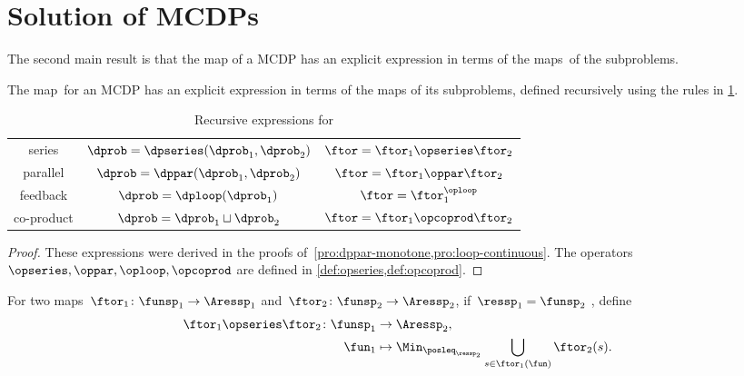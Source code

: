 

\section{Solution of MCDPs}
\label{sec:Solution-of-Monotone}

The second main result is that the map \ftor of a MCDP has an explicit
expression in terms of the maps~\ftor of the subproblems.


\begin{theorem}
  \label{thm:CDP-solvig}The map~\ftor for an MCDP has an explicit
  expression in terms of the maps \ftor of its subproblems, defined
  recursively using the rules in \cref{tab:Correspondence}.
\end{theorem}

\begin{table}[h]
  \begin{centering}
    \caption{Recursive expressions for \ftor\label{tab:Correspondence}}
  \end{centering}
  \centering{}\setlength\extrarowheight{5pt}\normalsize
  \begin{tabular}{ccc}
    series & $\dprob=\dpseries(\dprob_{1},\dprob_{2})$ & $\ftor=\ftor_{1}\opseries\ftor_{2}$\tabularnewline
    parallel & $\dprob=\dppar(\dprob_{1},\dprob_{2})$ & $\ftor=\ftor_{1}\oppar\ftor_{2}$\tabularnewline
    feedback & $\dprob=\dploop(\dprob_{1})$ & $\ftor=\ftor_{1}^{\oploop}$\tabularnewline
    co-product & $\dprob=\dprob_{1}\sqcup\dprob_{2}$ & $\ftor=\ftor_{1}\opcoprod\ftor_{2}$\tabularnewline
  \end{tabular}
\end{table}

\begin{proof}
  These expressions were derived in the proofs of~\cref{pro:dppar-monotone,pro:loop-continuous}.
  The operators $\opseries,\oppar,\oploop,\opcoprod$ are defined
  in \cref{def:opseries,def:opcoprod}.
\end{proof}
\begin{definition}
  \label{def:opseries}
  For two maps~$\ftor_{1}\colon\funsp_{1}\rightarrow\Aressp_{1}$
  and~$\ftor_{2}\colon\funsp_{2}\rightarrow\Aressp_{2}$, if~$\ressp_{1}=\funsp_{2}$
  , define
  \begin{align*}
  {\displaystyle \ftor_{1}\opseries\ftor_{2}\colon\funsp_{1}}
    & \rightarrow\Aressp_{2},\\
    \fun_{1} & \mapsto\Min_{\posleq_{\ressp_{2}}}\bigcup_{s\in\ftor_{1}(\fun)}\ftor_{2}(s).
  \end{align*}
\end{definition}

